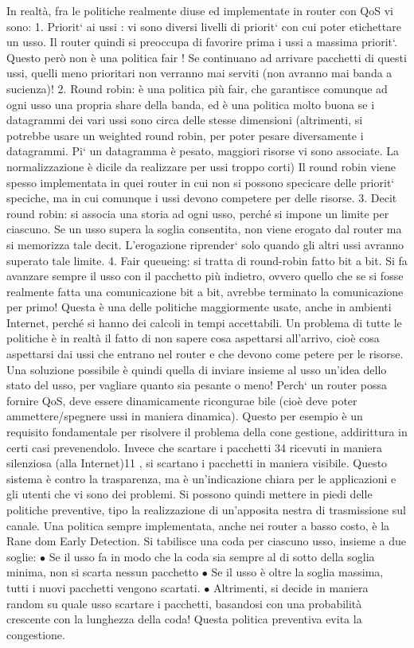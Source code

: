 In realtà, fra le politiche realmente diuse ed implementate in router con
QoS vi sono:
1. Priorit` ai ussi : vi sono diversi livelli di priorit` con cui poter etichettare
un usso. Il router quindi si preoccupa di favorire prima i ussi a massima
priorit`. Questo però non è una politica fair ! Se continuano ad arrivare
pacchetti di questi ussi, quelli meno prioritari non verranno mai serviti
(non avranno mai banda a sucienza)!
2. Round robin: è una politica più fair, che garantisce comunque ad ogni
usso una propria share della banda, ed è una politica molto buona se i
datagrammi dei vari ussi sono circa delle stesse dimensioni (altrimenti,
si potrebbe usare un weighted round robin, per poter pesare diversamente
i datagrammi. Pi` un datagramma è pesato, maggiori risorse vi sono
associate. La normalizzazione è dicile da realizzare per ussi troppo
corti) Il round robin viene spesso implementata in quei router in cui non
si possono specicare delle priorit` speciche, ma in cui comunque i ussi
devono competere per delle risorse.
3. Decit round robin: si associa una storia ad ogni usso, perché si impone
un limite per ciascuno. Se un usso supera la soglia consentita, non viene
erogato dal router ma si memorizza tale decit. L'erogazione riprender`
solo quando gli altri ussi avranno superato tale limite.
4. Fair queueing: si tratta di round-robin fatto bit a bit. Si fa avanzare
sempre il usso con il pacchetto più indietro, ovvero quello che se si fosse
realmente fatta una comunicazione bit a bit, avrebbe terminato la comunicazione per primo! Questa è una delle politiche
maggiormente usate,
anche in ambienti Internet, perché si hanno dei calcoli in tempi accettabili.
Un problema di tutte le politiche è in realtà il fatto di non sapere cosa aspettarsi
all'arrivo, cioè cosa aspettarsi dai ussi che entrano nel router e che devono come
petere per le risorse. Una soluzione possibile è quindi quella di inviare insieme
al usso un'idea dello stato del usso, per vagliare quanto sia pesante o meno!
Perch` un router possa fornire QoS, deve essere dinamicamente ricongurae
bile (cioè deve poter ammettere/spegnere ussi in maniera dinamica). Questo
per esempio è un requisito fondamentale per risolvere il problema della cone
gestione, addirittura in certi casi prevenendolo. Invece che scartare i pacchetti
34
ricevuti in maniera silenziosa (alla Internet)11 , si scartano i pacchetti in maniera
visibile. Questo sistema è contro la trasparenza, ma è un'indicazione chiara per
le applicazioni e gli utenti che vi sono dei problemi. Si possono quindi mettere
in piedi delle politiche preventive, tipo la realizzazione di un'apposita nestra di
trasmissione sul canale.
Una politica sempre implementata, anche nei router a basso costo, è la Rane
dom Early Detection. Si tabilisce una coda per ciascuno usso, insieme a due
soglie:
$\bullet$ Se il usso fa in modo che la coda sia sempre al di sotto della soglia
minima, non si scarta nessun pacchetto
$\bullet$ Se il usso è oltre la soglia massima, tutti i nuovi pacchetti vengono
scartati.
$\bullet$ Altrimenti, si decide in maniera random su quale usso scartare i pacchetti, basandosi con una probabilità
crescente con la lunghezza della
coda!
Questa politica preventiva evita la congestione.
